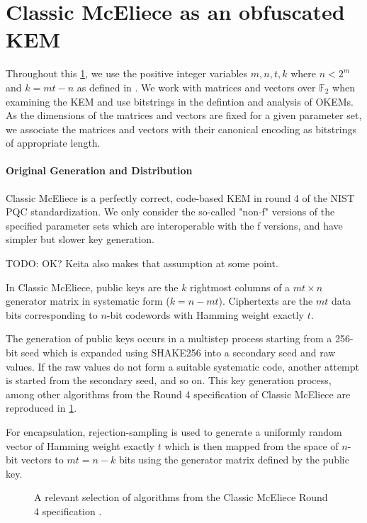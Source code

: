 \section{Classic McEliece as an obfuscated KEM} \label{sec:obfuscating-classic-mceliece}

Throughout this \cref{sec:obfuscating-classic-mceliece}, we use the positive integer variables $m,n,t,k$ where $n < 2^m$ and $k=mt-n$ as defined in \cite{NISTPQC-R4:ClassicMcEliece22}. We work with matrices and vectors over $\mathbb F_2$ when examining the KEM and use bitstrings in the defintion and analysis of OKEMs. As the dimensions of the matrices and vectors are fixed for a given parameter set, we associate the matrices and vectors with their canonical encoding as bitstrings of appropriate length.

\paragraph{Original Generation and Distribution}
Classic McEliece \cite{NISTPQC-R4:ClassicMcEliece22} is a perfectly correct, code-based KEM in round 4 of the NIST PQC standardization. We only consider the so-called "non-f" versions of the specified parameter sets which are interoperable with the f versions, and have simpler but slower key generation.

TODO: OK? Keita also makes that assumption at some point.

In Classic McEliece, public keys are the $k$ rightmost columns of a $mt \times n$ generator matrix in systematic form ($k = n - mt$). Ciphertexts are the $mt$ data bits corresponding to $n$-bit codewords with Hamming weight exactly $t$.

The generation of public keys occurs in a multistep process starting from a 256-bit seed which is expanded using SHAKE256 into a secondary seed and raw values. If the raw values do not form a suitable systematic code, another attempt is started from the secondary seed, and so on. This key generation process, among other algorithms from the Round 4 specification of Classic McEliece are reproduced in \cref{fig:classic-mceliece-spec}.

For encapsulation, rejection-sampling is used to generate a uniformly random vector of Hamming weight exactly $t$ which is then mapped from the space of $n$-bit vectors to $mt=n-k$ bits using the generator matrix defined by the public key.

\begin{figure}
    
    \caption{A relevant selection of algorithms from the Classic McEliece Round 4 specification \cite{NISTPQC-R4:ClassicMcEliece22}.}
    \label{fig:classic-mceliece-spec}
\end{figure}

